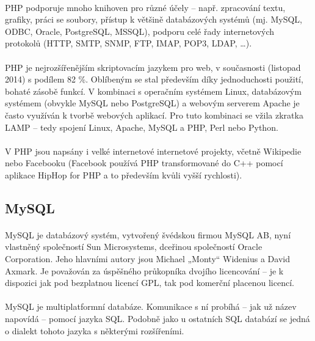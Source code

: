 \paragraph{}
PHP podporuje mnoho knihoven pro různé účely – např. zpracování textu, grafiky, práci se soubory, přístup k většině databázových systémů (mj. MySQL, ODBC, Oracle, PostgreSQL, MSSQL), podporu celé řady internetových protokolů (HTTP, SMTP, SNMP, FTP, IMAP, POP3, LDAP, …).
\paragraph{}
PHP je nejrozšířenějším skriptovacím jazykem pro web, v současnosti (listopad 2014) s podílem 82 \%. Oblíbeným se stal především díky jednoduchosti použití, bohaté zásobě funkcí. V kombinaci s operačním systémem Linux, databázovým systémem (obvykle MySQL nebo PostgreSQL) a webovým serverem Apache je často využíván k tvorbě webových aplikací. Pro tuto kombinaci se vžila zkratka LAMP – tedy spojení Linux, Apache, MySQL a PHP, Perl nebo Python.
\paragraph{}
V PHP jsou napsány i velké internetové internetové projekty, včetně Wikipedie nebo Facebooku (Facebook používá PHP transformované do C++ pomocí aplikace HipHop for PHP a to především kvůli vyšší rychlosti).


\subsection{MySQL}
\paragraph{}
MySQL je databázový systém, vytvořený švédskou firmou MySQL AB, nyní vlastněný společností Sun Microsystems, dceřinou společností Oracle Corporation. Jeho hlavními autory jsou Michael „Monty“ Widenius a David Axmark. Je považován za úspěšného průkopníka dvojího licencování – je k dispozici jak pod bezplatnou licencí GPL, tak pod komerční placenou licencí.
\paragraph{}
MySQL je multiplatformní databáze. Komunikace s ní probíhá – jak už název napovídá – pomocí jazyka SQL. Podobně jako u ostatních SQL databází se jedná o dialekt tohoto jazyka s některými rozšířeními.
